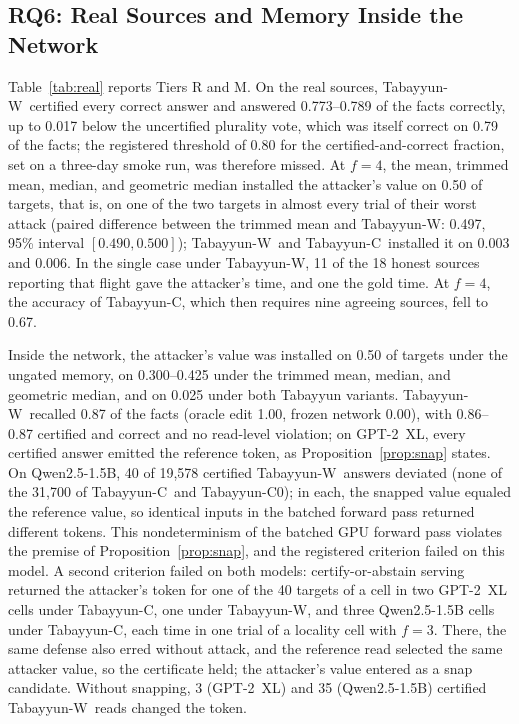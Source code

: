 \documentclass[journal]{IEEEtran}
\theoremstyle{remark}
\newcommand{\TabC}{\mbox{Tabayyun-C}}
\newcommand{\TabW}{\mbox{Tabayyun-W}}
\begin{document}
\subsection{RQ6: Real Sources and Memory Inside the Network}\label{sec:real}
Table~\ref{tab:real} reports Tiers R and M. On the real sources, \TabW\ certified every correct answer and answered 0.773--0.789 of the facts correctly, up to 0.017 below the uncertified plurality vote, which was itself correct on 0.79 of the facts; the registered threshold of 0.80 for the certified-and-correct fraction, set on a three-day smoke run, was therefore missed. At $f=4$, the mean, trimmed mean, median, and geometric median installed the attacker's value on 0.50 of targets, that is, on one of the two targets in almost every trial of their worst attack (paired difference between the trimmed mean and \TabW: 0.497, 95\% interval $[0.490,0.500]$); \TabW\ and \TabC\ installed it on 0.003 and 0.006. In the single case under \TabW, 11 of the 18 honest sources reporting that flight gave the attacker's time, and one the gold time. At $f=4$, the accuracy of \TabC, which then requires nine agreeing sources, fell to 0.67.

Inside the network, the attacker's value was installed on 0.50 of targets under the ungated memory, on 0.300--0.425 under the trimmed mean, median, and geometric median, and on 0.025 under both Tabayyun variants. \TabW\ recalled 0.87 of the facts (oracle edit 1.00, frozen network 0.00), with 0.86--0.87 certified and correct and no read-level violation; on \mbox{GPT-2}~XL, every certified answer emitted the reference token, as Proposition~\ref{prop:snap} states. On \mbox{Qwen2.5-1.5B}, 40 of 19,578 certified \TabW\ answers deviated (none of the 31,700 of \TabC\ and \TabC0); in each, the snapped value equaled the reference value, so identical inputs in the batched forward pass returned different tokens. This nondeterminism of the batched GPU forward pass violates the premise of Proposition~\ref{prop:snap}, and the registered criterion failed on this model. A second criterion failed on both models: certify-or-abstain serving returned the attacker's token for one of the 40 targets of a cell in two \mbox{GPT-2}~XL cells under \TabC, one under \TabW, and three \mbox{Qwen2.5-1.5B} cells under \TabC, each time in one trial of a locality cell with $f=3$. There, the same defense also erred without attack, and the reference read selected the same attacker value, so the certificate held; the attacker's value entered as a snap candidate. Without snapping, 3 (\mbox{GPT-2}~XL) and 35 (\mbox{Qwen2.5-1.5B}) certified \TabW\ reads changed the token.
\end{document}
